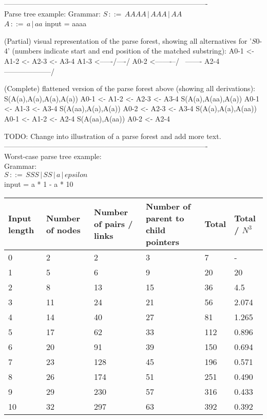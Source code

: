 \documentclass[a4paper,10pt]{article}
\begin{document}
-------------------------------------------------------------------------------------\\

Parse tree example:
Grammar:
$S\,::=\,AAAA\,|\,AAA\,|\,AA$\\
$A\,::=\,a\,|\,aa$
input = aaaa

(Partial) visual representation of the parse forest, showing all alternatives for '$S$0-4' (numbers indicate start and end position of the matched substring):
A0-1 <- A1-2 <- A2-3 <- A3-4
 \- A1-3 <--\-----/----/
A0-2 <-------\---/
 \            \-------- A2-4
  \---------------------/

(Complete) flattened version of the parse forest above (showing all derivations):
S(A(a),A(a),A(a),A(a))	A0-1 <- A1-2 <- A2-3 <- A3-4
S(A(a),A(aa),A(a))	A0-1 <- A1-3 <- A3-4
S(A(aa),A(a),A(a))	A0-2 <- A2-3 <- A3-4
S(A(a),A(a),A(aa))	A0-1 <- A1-2 <- A2-4
S(A(aa),A(aa))		A0-2 <- A2-4

TODO: Change into illustration of a parse forest and add more text.\\

-------------------------------------------------------------------------------------\\

Worst-case parse tree example:\\

Grammar:\\
$S\,::=\,SSS\,|\,SS\,|\,a\,|\,epsilon$\\
input = a * 1 - a * 10\\

\begin{tabular}{ | p{5em} | p{5em} | p{5em} | p{8em} | p{5em} | p{5em} |}
  \hline
  Input length & Number of nodes & Number of pairs / links & Number of parent to child pointers & Total & Total / $N^{3}$ \\
  \hline
  0 & 2 & 2 & 3 & 7 & - \\
  1 & 5 & 6 & 9 & 20 & 20 \\
  2 & 8 & 13 & 15 & 36 & 4.5 \\
  3 & 11 & 24 & 21 & 56 & 2.074 \\
  4 & 14 & 40 & 27 & 81 & 1.265 \\
  5 & 17 & 62 & 33 & 112 & 0.896 \\
  6 & 20 & 91 & 39 & 150 & 0.694 \\
  7 & 23 & 128 & 45 & 196 & 0.571 \\
  8 & 26 & 174 & 51 & 251 & 0.490 \\
  9 & 29 & 230 & 57 & 316 & 0.433 \\
  10 & 32 & 297 & 63 & 392 & 0.392 \\
  \hline
\end{tabular}
\end{document}
